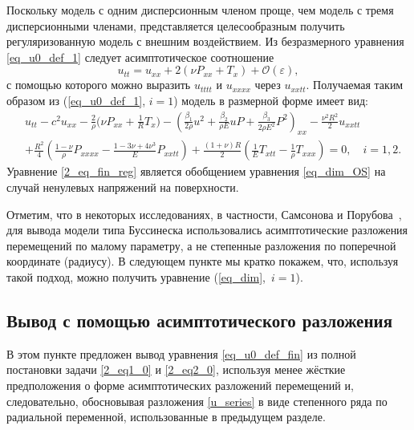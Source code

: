 \documentclass[12pt, a4paper]{report}
\newcommand{\lb}{\left (}
\newcommand{\rb}{\right )}
\begin{document}

Поскольку модель с одним дисперсионным членом проще, чем модель с тремя дисперсионными членами, представляется целесообразным получить регуляризованную модель с внешним воздействием. Из безразмерного уравнения \eqref{eq_u0_def_1} следует асимптотическое соотношение 
\begin{equation}\label{key}
u_{tt} = u_{xx} + 2(\nu P_{xx} + T_{x}) + \mathcal{O}(\varepsilon),
\end{equation}
с помощью которого можно выразить $u_{tttt}$ и $u_{xxxx}$ через $u_{xxtt}$. Получаемая таким образом из (\ref{eq_u0_def_1}, $i=1$) модель в размерной форме имеет вид:
\begin{equation}\label{2_eq_fin_reg}
\begin{split}
&u_{tt} - c^2 u_{xx} - \frac{2}{\rho}\bigg(\nu P_{xx} + \frac1R T_x\bigg) - \left(\frac{\beta_1}{2\rho} u^2 + \frac{\beta_2}{\rho E} u P + \frac{\beta_3}{2\rho E^2} P^2\right)_{xx} - \frac{\nu^2 R^2}{2} u_{xxtt}\\
& + \frac{R^2}{4} \lb\frac{1-\nu}{\rho}P_{xxxx} - \frac{1-3\nu+4\nu^3}{E}P_{xxtt}\rb + \frac{(1+\nu)R}{2}\lb \frac{1}{E}T_{xtt} - \frac{1}{\rho}T_{xxx} \rb = 0, \quad i = 1,2.
\end{split}
\end{equation}
Уравнение \eqref{2_eq_fin_reg} является обобщением уравнения \eqref{eq_dim_OS} на случай ненулевых напряжений на поверхности.

Отметим, что в некоторых исследованиях, в частности, Самсонова и Порубова~\cite{SP, S_book, P_book}, для вывода модели типа Буссинеска использовались асимптотические разложения перемещений по малому параметру, а не степенные разложения по поперечной координате (радиусу). В следующем пункте мы кратко покажем, что, используя такой подход, можно получить уравнение (\ref{eq_dim},~$i=1$).



\subsection{Вывод с помощью асимптотического разложения}
В этом пункте предложен вывод уравнения \eqref{eq_u0_def_fin} из полной постановки задачи \eqref{2_eq1_0} и \eqref{2_eq2_0}, используя менее жёсткие предположения о форме асимптотических разложений перемещений и, следовательно, обосновывая разложения \eqref{u_series} в виде степенного ряда по радиальной переменной, использованные в предыдущем разделе.
\end{document}
